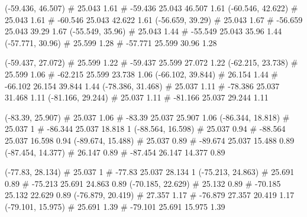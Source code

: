 \documentclass[a4paper,openbib,10pt]{article}
\newenvironment{treegraph}{\begin{graph}}{\end{graph}}
\begin{document}
\begin{treegraph}
  (-59.436, 46.507) #     25.043    1.61
   #    -59.436    25.043    46.507    1.61
  (-60.546, 42.622) #     25.043    1.61
   #    -60.546    25.043    42.622    1.61
  (-56.659, 39.29) #     25.043    1.67
   #    -56.659    25.043    39.29    1.67
  (-55.549, 35.96) #     25.043    1.44
   #    -55.549    25.043    35.96    1.44
  (-57.771, 30.96) #     25.599    1.28
   #    -57.771    25.599    30.96    1.28

  (-59.437, 27.072) #     25.599    1.22
   #    -59.437    25.599    27.072    1.22
  (-62.215, 23.738) #     25.599    1.06
   #    -62.215    25.599    23.738    1.06
  (-66.102, 39.844) #     26.154    1.44
   #    -66.102    26.154    39.844    1.44
  (-78.386, 31.468) #     25.037    1.11
   #    -78.386    25.037    31.468    1.11
  (-81.166, 29.244) #     25.037    1.11
   #    -81.166    25.037    29.244    1.11

  (-83.39, 25.907) #     25.037    1.06
   #    -83.39    25.037    25.907    1.06
  (-86.344, 18.818) #     25.037    1
   #    -86.344    25.037    18.818    1
  (-88.564, 16.598) #     25.037    0.94
   #    -88.564    25.037    16.598    0.94
  (-89.674, 15.488) #     25.037    0.89
   #    -89.674    25.037    15.488    0.89
  (-87.454, 14.377) #     26.147    0.89
   #    -87.454    26.147    14.377    0.89

  (-77.83, 28.134) #     25.037    1
   #    -77.83    25.037    28.134    1
  (-75.213, 24.863) #     25.691    0.89
   #    -75.213    25.691    24.863    0.89
  (-70.185, 22.629) #     25.132    0.89
   #    -70.185    25.132    22.629    0.89
  (-76.879, 20.419) #     27.357    1.17
   #    -76.879    27.357    20.419    1.17
  (-79.101, 15.975) #     25.691    1.39
   #    -79.101    25.691    15.975    1.39


\end{treegraph}
\end{document}
